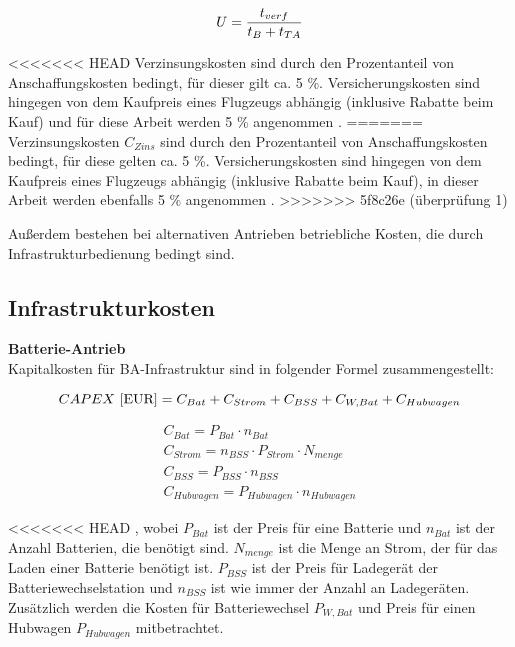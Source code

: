 \begin{equation}
   U = \frac{t_{verf}}{t_B + t_{TA}} \\
   \label{utilisation}
\end{equation}

<<<<<<< HEAD
Verzinsungskosten sind durch den Prozentanteil von Anschaffungskosten bedingt, für dieser gilt ca. 5 \%. Versicherungskosten sind 
hingegen von dem Kaufpreis eines Flugzeugs abhängig (inklusive Rabatte beim Kauf) und für diese Arbeit werden 5 \% angenommen 
\cite{scholz_design_evaluation_doc}.
=======
Verzinsungskosten $C_{Zins}$ sind durch den Prozentanteil von Anschaffungskosten bedingt, für diese gelten ca. 5 \%. 
Versicherungskosten sind hingegen von dem Kaufpreis eines Flugzeugs abhängig (inklusive Rabatte beim Kauf), 
in dieser Arbeit werden ebenfalls 5 \% angenommen \cite{scholz_design_evaluation_doc}.
>>>>>>> 5f8c26e (überprüfung 1)

Außerdem bestehen bei alternativen Antrieben betriebliche Kosten, die durch Infrastrukturbedienung bedingt sind.
\subsection{Infrastrukturkosten}

\textbf{Batterie-Antrieb}\\
Kapitalkosten für BA-Infrastruktur sind in folgender Formel zusammengestellt:

\begin{equation}
     {CAPEX ~[\text{EUR}]} = C_{Bat} + C_{Strom} + C_{BSS} + C_{W,Bat} + C_{Hubwagen}\\
     \label{BA_Infrastruktur}
  \end{equation}

\begin{equation}
   \begin{split}
  {C_{Bat}} = P_{Bat} \cdot n_{Bat}\\
  {C_{Strom}} = n_{BSS} \cdot P_{Strom} \cdot N_{menge}\\
  {C_{BSS}} = P_{BSS} \cdot n_{BSS} \\
  {C_{Hubwagen}} = P_{Hubwagen} \cdot n_{Hubwagen}
  \label{BA}
   \end{split}
  \end{equation}

<<<<<<< HEAD
, wobei $P_{Bat}$ ist der Preis für eine Batterie und $n_{Bat}$ ist der Anzahl Batterien, die benötigt sind.
$N_{menge}$ ist die Menge an Strom, der für das Laden einer Batterie benötigt ist.
$P_{BSS}$ ist der Preis für Ladegerät der Batteriewechselstation und $n_{BSS}$ ist wie immer der Anzahl an Ladegeräten. 
Zusätzlich werden die Kosten für
Batteriewechsel $P_{W,Bat}$ und Preis für einen Hubwagen $P_{Hubwagen}$ mitbetrachtet.
  
